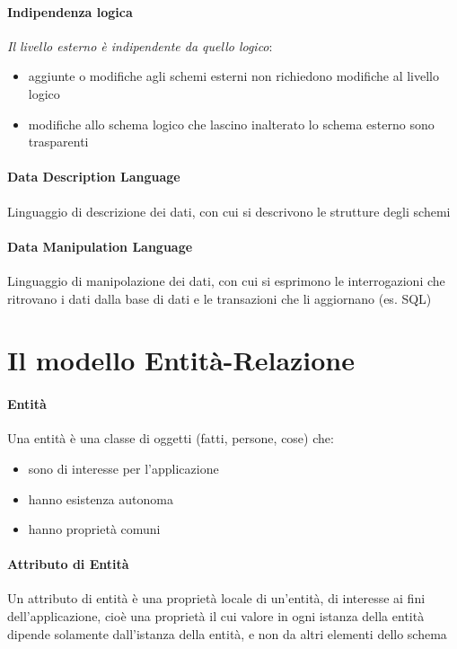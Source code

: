 \documentclass[12pt]{article}
\begin{document}
    \paragraph{Indipendenza logica}
    \textit{Il livello esterno è indipendente da quello logico}: 
    \begin{itemize}
        \item aggiunte o modifiche agli schemi esterni non richiedono modifiche al livello logico
        \item modifiche allo schema logico che lascino inalterato lo schema esterno sono trasparenti 
    \end{itemize}

    \paragraph{Data Description Language}
    Linguaggio di descrizione dei dati, con cui si descrivono le strutture degli schemi
    \paragraph{Data Manipulation Language}
    Linguaggio di manipolazione dei dati, con cui si esprimono le interrogazioni che ritrovano i dati dalla base di dati e le transazioni che li aggiornano (es. SQL)

    \section{Il modello Entità-Relazione}
    \paragraph{Entità}
    Una entità è una classe di oggetti (fatti, persone, cose) che:
    \begin{itemize}
        \item sono di interesse per l’applicazione
        \item hanno esistenza autonoma
        \item hanno proprietà comuni
    \end{itemize}
    \paragraph{Attributo di Entità}
    Un attributo di entità è una proprietà locale di un’entità, di interesse ai fini dell’applicazione, cioè una proprietà il cui valore in ogni istanza della entità dipende solamente dall’istanza della entità, e non da altri elementi dello schema
\end{document}
